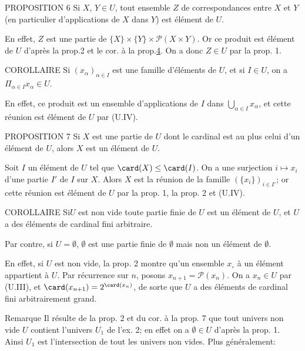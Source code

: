 \begin{enonce*}{PROPOSITION 6}
Si $X$, $Y\in U$, tout ensemble $Z$ de correspondances entre $X$ et
$Y$ (en particulier d'applications de $X$ dans $Y$) est élément de
$U$.
\end{enonce*}
En effet, $Z$ est une partie de $\{X\}\times \{Y\}\times
\mathcal{P}(X\times Y)$. Or ce produit est élément de $U$
d'après la
prop.2 et le cor. à la prop.\hyperref[I.sec4]{4}. On a donc $Z\in
U$ par la prop. 1.

\begin{enonce*}{COROLLAIRE}
Si $(x_{\alpha})_{\alpha \in I}$ est une famille d'éléments de $U$,
et si $I\in U$, on a $\Pi_{\alpha\in I}x_{\alpha} \in U$.
\end{enonce*}
En effet, ce produit est un ensemble d'applications de $I$ dans
$\bigcup_{\alpha\in I}x_{\alpha}$, et cette réunion est élément de
$U$ par (U.IV).

\begin{enonce*}{PROPOSITION 7}
Si $X$ est une partie de $U$ dont le cardinal est au plus celui d'un
élément de $U$, alors $X$ est un élément de $U$.
\end{enonce*}
Soit $I$ un élément de $U$ tel que $\card(X)\leq \card(I)$. On a une
surjection $i\mapsto x_i$ d'une partie $I'$ de $I$ sur $X$. Alors
$X$ est la réunion de la famille $(\{x_i\})_{i\in I'}$; or cette
réunion est élément de $U$ par la prop. 1, la prop. 2 et (U.IV).

\begin{enonce*}{COROLLAIRE}
Si\pageoriginale $U$ est non vide toute partie finie de $U$ est un
élément de $U$, et $U$ a des éléments de cardinal fini arbitraire.
\end{enonce*}
Par contre, si $U=∅$, $∅$ est une partie finie
de $∅$ mais non un élément de $∅$.

En effet, si $U$ est non vide, la prop. 2 montre qu'un ensemble
$x_{\circ}$ à un élément appartient à $U$. Par récurrence sur $n$,
posons $x_{n+1}=\mathcal{P}(x_n)$. On %
a $x_n\in U$ par (U.III), et $\card(x_{n+1})=2^{\card(x_n)}$, de
sorte que $U$ a des éléments de cardinal fini arbitrairement grand.

\begin{enonce*}[remark]{Remarque}
Il résulte de la prop. 2 et du cor. à la prop. 7 que tout univers
non vide $U$ contient l'univers $U_1$ de l'ex. 2; en effet on a
$∅\in U$ d'après la prop. 1. Ainsi $U_1$ est
l'intersection de tout les univers non vides. Plus généralement:
\end{enonce*}

